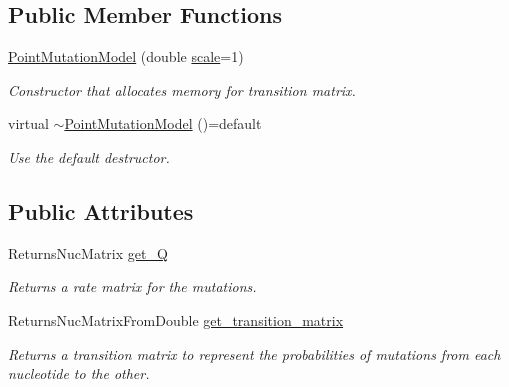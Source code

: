 \subsection*{Public Member Functions}
\begin{DoxyCompactItemize}
\item 
\mbox{\label{classretrocombinator_1_1PointMutationModel_a4c83f671b3d76f8cf39ae5b5a1be658e}} 
\hyperlink{classretrocombinator_1_1PointMutationModel_a4c83f671b3d76f8cf39ae5b5a1be658e}{Point\+Mutation\+Model} (double \hyperlink{classretrocombinator_1_1PointMutationModel_a3258dfbdae0f2614cdc66f13ae028b46}{scale}=1)
\begin{DoxyCompactList}\small\item\em Constructor that allocates memory for transition matrix. \end{DoxyCompactList}\item 
virtual \hyperlink{classretrocombinator_1_1PointMutationModel_a86a21482afab3faa92b5b05153c92915}{$\sim$\+Point\+Mutation\+Model} ()=default
\begin{DoxyCompactList}\small\item\em Use the default destructor. \end{DoxyCompactList}\end{DoxyCompactItemize}
\subsection*{Public Attributes}
\begin{DoxyCompactItemize}
\item 
Returns\+Nuc\+Matrix \hyperlink{classretrocombinator_1_1PointMutationModel_a6c6e94bfbf16c3893068e3db1597e941}{get\+\_\+Q}
\begin{DoxyCompactList}\small\item\em Returns a rate matrix for the mutations. \end{DoxyCompactList}\item 
Returns\+Nuc\+Matrix\+From\+Double \hyperlink{classretrocombinator_1_1PointMutationModel_a5f17e2f93b22723721a4d04ac2c77aaa}{get\+\_\+transition\+\_\+matrix}
\begin{DoxyCompactList}\small\item\em Returns a transition matrix to represent the probabilities of mutations from each nucleotide to the other. \end{DoxyCompactList}\end{DoxyCompactItemize}
